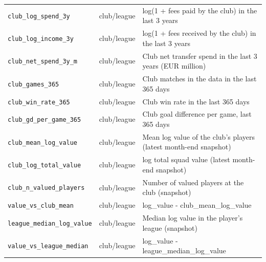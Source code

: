 \begin{table}[t]
\begin{tabular}{llp{11.5cm}}
\texttt{club\_log\_spend\_3y} & club/league & log(1 + fees paid by the club) in the last 3 years \\
\texttt{club\_log\_income\_3y} & club/league & log(1 + fees received by the club) in the last 3 years \\
\texttt{club\_net\_spend\_3y\_m} & club/league & Club net transfer spend in the last 3 years (EUR million) \\
\texttt{club\_games\_365} & club/league & Club matches in the data in the last 365 days \\
\texttt{club\_win\_rate\_365} & club/league & Club win rate in the last 365 days \\
\texttt{club\_gd\_per\_game\_365} & club/league & Club goal difference per game, last 365 days \\
\texttt{club\_mean\_log\_value} & club/league & Mean log value of the club's players (latest month-end snapshot) \\
\texttt{club\_log\_total\_value} & club/league & log total squad value (latest month-end snapshot) \\
\texttt{club\_n\_valued\_players} & club/league & Number of valued players at the club (snapshot) \\
\texttt{value\_vs\_club\_mean} & club/league & log\_value - club\_mean\_log\_value \\
\texttt{league\_median\_log\_value} & club/league & Median log value in the player's league (snapshot) \\
\texttt{value\_vs\_league\_median} & club/league & log\_value - league\_median\_log\_value \\
\bottomrule
\end{tabular}
\end{table}
